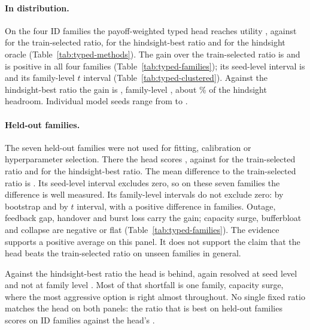 \documentclass[10pt]{article}
\begin{document}
\paragraph{In distribution.}
On the four ID families the payoff-weighted typed head reaches utility \TypedIdBayesUtility{}, against \TypedIdBaseUtility{} for the train-selected ratio, \TypedIdBestFixedUtility{} for the hindsight-best ratio and \TypedIdOracleUtility{} for the hindsight oracle (Table~\ref{tab:typed-methods}). The gain over the train-selected ratio is \TypedAuditIdBayesVsTrain{} and is positive in all four families (Table~\ref{tab:typed-families}); its seed-level interval is \TypedAuditIdBayesVsTrainSeed{} and its family-level $t$ interval \TypedAuditIdBayesVsTrainT{} (Table~\ref{tab:typed-clustered}). Against the hindsight-best ratio the gain is \TypedAuditIdBayesVsHindsight{}, family-level \TypedAuditIdBayesVsHindsightT{}, about \TypedIdHeadroomShare\% of the hindsight headroom. Individual model seeds range from \TypedIdBayesSeedMin{} to \TypedIdBayesSeedMax{}.

\paragraph{Held-out families.}
The seven held-out families were not used for fitting, calibration or hyperparameter selection. There the head scores \TypedOodBayesUtility{}, against \TypedOodBaseUtility{} for the train-selected ratio and \TypedOodBestFixedUtility{} for the hindsight-best ratio. The mean difference to the train-selected ratio is \TypedAuditOodBayesVsTrain{}. Its seed-level interval \TypedAuditOodBayesVsTrainSeed{} excludes zero, so on these seven families the difference is well measured. Its family-level intervals do not exclude zero: \TypedAuditOodBayesVsTrainFamily{} by bootstrap and \TypedAuditOodBayesVsTrainT{} by $t$ interval, with a positive difference in \TypedAuditOodBayesVsTrainPositive{} families. Outage, feedback gap, handover and burst loss carry the gain; capacity surge, bufferbloat and collapse are negative or flat (Table~\ref{tab:typed-families}). The evidence supports a positive average on this panel. It does not support the claim that the head beats the train-selected ratio on unseen families in general.

Against the hindsight-best ratio the head is \TypedAuditOodBayesVsHindsight{} behind, again resolved at seed level \TypedAuditOodBayesVsHindsightSeed{} and not at family level \TypedAuditOodBayesVsHindsightT{}. Most of that shortfall is one family, capacity surge, where the most aggressive option is right almost throughout. No single fixed ratio matches the head on both panels: the ratio that is best on held-out families scores \TypedIdOodBestFixedUtility{} on ID families against the head's \TypedIdBayesUtility{}.
\end{document}

